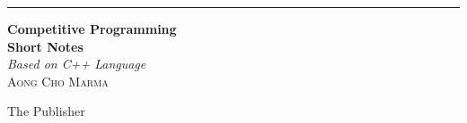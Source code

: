 \documentclass[11pt]{report} %
\newcommand*{\plogo}{\fbox{$\mathcal{PL}$}} %
\begin{document}

\begin{titlepage}
	\raggedleft %
	
	\rule{1pt}{\textheight} %
	\hspace{0.05\textwidth} %
	\parbox[b]{0.75\textwidth}{ %
		
		{\Huge\bfseries Competitive Programming\\[0.5\baselineskip] Short Notes}\\[2\baselineskip] %
		{\large\textit{Based on C++ Language}}\\[4\baselineskip] %
		{\Large\textsc{Aong Cho  Marma}} %
		
		\vspace{0.5\textheight} %
		
		{\noindent The Publisher~~\plogo}\\[\baselineskip] %
	}
\end{titlepage}

	
	\tableofcontents
	\pagenumbering{\roman}	
	
	\patchcmd{\chapter}{\thispagestyle{plain}}{\thispagestyle{fancy}}{}{}
	
	\pagestyle{main} %
	\setcounter{page}{1}
	\renewcommand{\theequation}{\arabic{chapter}.\arabic{equation}}
	
\end{document}
